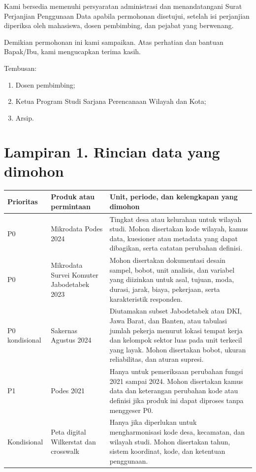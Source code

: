 \documentclass[12pt]{article}
\begin{document}
\PernyataanPenggunaanData

\PernyataanTanpaBiaya

Kami bersedia memenuhi persyaratan administrasi dan menandatangani Surat Perjanjian Penggunaan Data apabila permohonan disetujui, setelah isi perjanjian diperiksa oleh mahasiswa, dosen pembimbing, dan pejabat yang berwenang.

Demikian permohonan ini kami sampaikan. Atas perhatian dan bantuan Bapak/Ibu, kami mengucapkan terima kasih.

\vspace{8pt}
Tembusan:
\begin{enumerate}
  \item Dosen pembimbing;
  \item Ketua Program Studi Sarjana Perencanaan Wilayah dan Kota;
  \item Arsip.
\end{enumerate}

\TandaTanganBPS

\clearpage
\section*{Lampiran 1. Rincian data yang dimohon}

\renewcommand{\arraystretch}{1.25}
\begin{tabularx}{\textwidth}{@{}P{0.14\textwidth}P{0.30\textwidth}Y@{}}
\toprule
Prioritas & Produk atau permintaan & Unit, periode, dan kelengkapan yang dimohon \\
\midrule
P0 & Mikrodata Podes 2024 & Tingkat desa atau kelurahan untuk wilayah studi. Mohon disertakan kode wilayah, kamus data, kuesioner atau metadata yang dapat dibagikan, serta catatan perubahan definisi. \\
P0 & Mikrodata Survei Komuter Jabodetabek 2023 & Mohon disertakan dokumentasi desain sampel, bobot, unit analisis, dan variabel yang diizinkan untuk asal, tujuan, moda, durasi, jarak, biaya, pekerjaan, serta karakteristik responden. \\
P0 kondisional & Sakernas Agustus 2024 & Diutamakan subset Jabodetabek atau DKI, Jawa Barat, dan Banten, atau tabulasi jumlah pekerja menurut lokasi tempat kerja dan kelompok sektor luas pada unit terkecil yang layak. Mohon disertakan bobot, ukuran reliabilitas, dan aturan supresi. \\
P1 & Podes 2021 & Hanya untuk pemeriksaan perubahan fungsi 2021 sampai 2024. Mohon disertakan kamus data dan keterangan perubahan kode atau definisi jika produk ini dapat diproses tanpa menggeser P0. \\
Kondisional & Peta digital Wilkerstat dan crosswalk & Hanya jika diperlukan untuk mengharmonisasi kode desa, kecamatan, dan wilayah studi. Mohon disertakan tahun, sistem koordinat, kode, dan ketentuan penggunaan. \\
\bottomrule
\end{tabularx}
\end{document}
